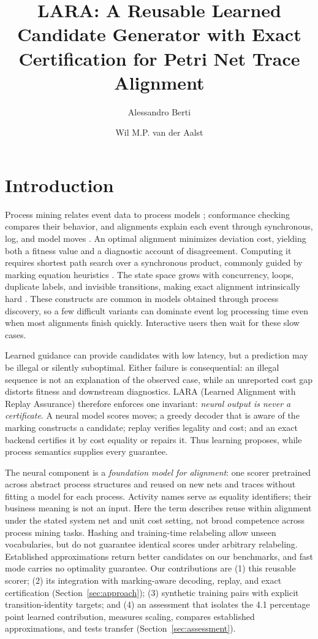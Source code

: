 \documentclass[manuscript,screen,nonacm]{acmart}
\title[LARA: Reusable Learned Candidate Generation]{LARA: A Reusable Learned Candidate Generator with Exact Certification for Petri Net Trace Alignment}
\author{Alessandro Berti}
\affiliation{%
  \institution{Process and Data Science (PADS), RWTH Aachen University}
  \city{Aachen}
  \country{Germany}}
\author{Wil M.P. van der Aalst}
\affiliation{%
  \institution{Process and Data Science (PADS), RWTH Aachen University}
  \city{Aachen}
  \country{Germany}}
\affiliation{%
  \institution{Celonis}
  \city{Munich}
  \country{Germany}}
\begin{document}
\raggedbottom

\maketitle

\section{Introduction}
\label{sec:introduction}

Process mining relates event data to process models \cite{Aalst2016}; conformance checking compares their behavior, and alignments explain each event through synchronous, log, and model moves \cite{Adriansyah2011}. An optimal alignment minimizes deviation cost, yielding both a fitness value and a diagnostic account of disagreement. Computing it requires shortest path search over a synchronous product, commonly guided by marking equation heuristics \cite{Dongen2018,Zelst2018}. The state space grows with concurrency, loops, duplicate labels, and invisible transitions, making exact alignment intrinsically hard \cite{Schwanen2026}. These constructs are common in models obtained through process discovery, so a few difficult variants can dominate event log processing time even when most alignments finish quickly. Interactive users then wait for these slow cases.

Learned guidance can provide candidates with low latency, but a prediction may be illegal or silently suboptimal. Either failure is consequential: an illegal sequence is not an explanation of the observed case, while an unreported cost gap distorts fitness and downstream diagnostics. LARA (Learned Alignment with Replay Assurance) therefore enforces one invariant: \emph{neural output is never a certificate}. A neural model scores moves; a greedy decoder that is aware of the marking constructs a candidate; replay verifies legality and cost; and an exact backend certifies it by cost equality or repairs it. Thus learning proposes, while process semantics supplies every guarantee.

The neural component is a \emph{foundation model for alignment}: one scorer pretrained across abstract process structures and reused on new nets and traces without fitting a model for each process. Activity names serve as equality identifiers; their business meaning is not an input. Here the term describes reuse within alignment under the stated system net and unit cost setting, not broad competence across process mining tasks. Hashing and training-time relabeling allow unseen vocabularies, but do not guarantee identical scores under arbitrary relabeling. Established approximations return better candidates on our benchmarks, and fast mode carries no optimality guarantee. Our contributions are (1) this reusable scorer; (2) its integration with marking-aware decoding, replay, and exact certification (Section~\ref{sec:approach}); (3) synthetic training pairs with explicit transition-identity targets; and (4) an assessment that isolates the 4.1 percentage point learned contribution, measures scaling, compares established approximations, and tests transfer (Section~\ref{sec:assessment}).
\end{document}
